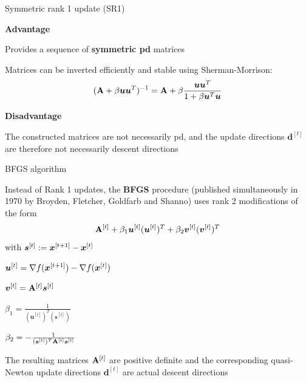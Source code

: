 \documentclass[11pt,compress,t,notes=noshow, xcolor=table]{beamer}
\begin{document}
\begin{framei}{Symmetric rank 1 update (SR1)}
\item[] \textbf{Advantage}
\begin{itemizeS}
\item Provides a sequence of \textbf{symmetric pd} matrices
\item Matrices can be inverted efficiently and stable using Sherman-Morrison:
$$
(\mathbf{A} + \beta \bm{u}\bm{u}^T)^{-1} = \mathbf{A} + \beta \frac{\bm{u}\bm{u}^T}{1 + \beta\bm{u}^T\bm{u}}
$$
\end{itemizeS}
\vfill
\item[] \textbf{Disadvantage}
\begin{itemizeS}
\item The constructed matrices are not necessarily pd, and the update directions $\bm{d}^{[t]}$ are therefore not necessarily descent directions
\end{itemizeS}
\end{framei}


\begin{framei}{BFGS algorithm}
\item Instead of Rank 1 updates, the \textbf{BFGS} procedure (published simultaneously in 1970 by Broyden, Fletcher, Goldfarb and Shanno) uses rank 2 modifications of the form
$$
\mathbf{A}^{[t]} + \beta_1 \bm{u}^{[t]}(\bm{u}^{[t]})^T + \beta_2 \bm{v}^{[t]}(\bm{v}^{[t]})^T
$$
with $\bm{s}^{[t]} := \bm{x}^{[t+1]} - \bm{x}^{[t]}$
\item $\bm{u}^{[t]} = \nabla f(\bm{x}^{[t+1]}) - \nabla f(\bm{x}^{[t]})$
\item $\bm{v}^{[t]} = \mathbf{A}^{[t]} \bm{s}^{[t]}$
\item $\beta_1 = \frac{1}{(\bm{u}^{[t]})^T (\bm{s}^{[t]})}$
\item $\beta_2 = - \frac{1}{(\bm{s}^{[t]})^T \mathbf{A}^{[t]} \bm{s}^{[t]}}$
\vfill
\item The resulting matrices $\mathbf{A}^{[t]}$ are positive definite and the corresponding quasi-Newton update directions $\bm{d}^{[t]}$ are actual descent directions
\end{framei}

\endlecture
\end{document}
